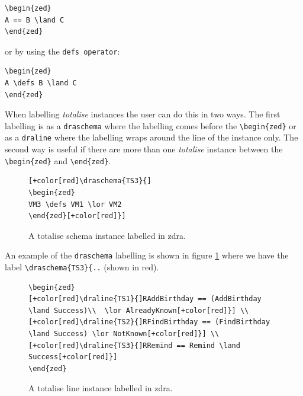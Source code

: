 \begin{verbatim}
\begin{zed}
A == B \land C
\end{zed}
\end{verbatim}

or by using the \verb|defs operator|:

\begin{verbatim}
\begin{zed}
A \defs B \land C
\end{zed}
\end{verbatim}

When labelling \emph{totalise} instances the user can do this in two ways. The first labelling is as a \verb|draschema| where the labelling comes before the \verb|\begin{zed}| or as a \verb|draline| where the labelling wraps around the line of the instance only. The second way is useful if there are more than one \emph{totalise} instance between the \verb|\begin{zed}| and \verb|\end{zed}|. 

\begin{figure}[H]
\centering
\begin{footnotesize}
\begin{BVerbatim}[commandchars=+\[\]]
[+color[red]\draschema{TS3}{]
\begin{zed}
VM3 \defs VM1 \lor VM2
\end{zed}[+color[red]}]
\end{BVerbatim}
\end{footnotesize}
\caption{\label{fig:exampleofts1} A totalise schema instance labelled in \gls{zdra}.}
\end{figure}

An example of the \verb|draschema| labelling is shown in figure \ref{fig:exampleofts1} where we have the label \verb|\draschema{TS3}{..| (shown in red).

\begin{figure}[H]
\centering
\begin{footnotesize}
\begin{BVerbatim}[commandchars=+\[\]]
\begin{zed} 
[+color[red]\draline{TS1}{]RAddBirthday == (AddBirthday \land Success)\\  \lor AlreadyKnown[+color[red]}] \\
[+color[red]\draline{TS2}{]RFindBirthday == (FindBirthday \land Success) \lor NotKnown[+color[red]}] \\
[+color[red]\draline{TS3}{]RRemind == Remind \land Success[+color[red]}]
\end{zed}
\end{BVerbatim}
\end{footnotesize}
\caption{\label{fig:exampleofts2} A totalise line instance labelled in \gls{zdra}.}
\end{figure}

